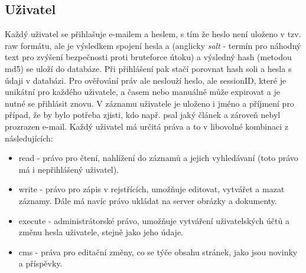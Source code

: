 \subsection{Uživatel}
Každý uživatel se přihlašuje e-mailem a heslem, s tím že heslo není uloženo v tzv. raw formátu, ale
je výsledkem spojení hesla a  (anglicky \textit{salt} - termín pro náhodný text pro zvýšení bezpečnosti proti bruteforce útoku) a
výsledný hash (metodou md5) se uloží do databáze. Při přihlášení pak stačí porovnat hash soli a hesla s údaji v databázi.
Pro ověřování práv ale neslouží heslo, ale sessionID, které je unikátní pro každého uživatele, a časem nebo
manuálně může expirovat a je nutné se přihlásit znovu. V záznamu uživatele je uloženo i jméno a příjmení pro případ, že
by bylo potřeba zjisti, kdo např. psal jaký článek a zároveň nebyl prozrazen e-mail.
Každý uživatel má určitá práva a to v libovolné kombinaci z následujících:
\begin{itemize}
     \item read - právo pro čtení, nahlížení do záznamů a jejich vyhledávaní (toto právo má i nepřihlášený uživatel).
     \item write - právo pro zápis v rejstřících, umožňuje editovat, vytvářet a mazat záznamy. Dále má navíc právo ukládat na server obrázky a dokumenty.
     \item execute - administrátorské právo, umožňuje vytváření uživatelských účtů a změnu hesla uživatele, stejně jako jeho údaje.
     \item cms - práva pro editační změny, co se týče obsahu stránek, jako jsou novinky a příspěvky.
\end{itemize}
